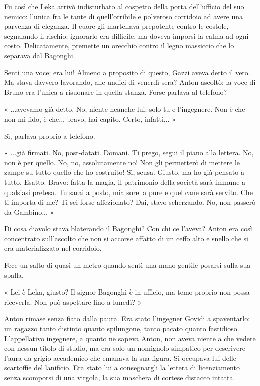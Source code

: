 Fu così che Leka arrivò indisturbato al cospetto della porta dell'ufficio del suo nemico: l'unica fra le tante di quell'orribile e polveroso corridoio ad avere una parvenza di eleganza. Il cuore gli martellava prepotente contro le costole, segnalando il rischio; ignorarlo era difficile, ma doveva imporsi la calma ad ogni costo. Delicatamente, premette un orecchio contro il legno massiccio che lo separava dal Bagonghi.

Sentì una voce: era lui! Almeno a proposito di questo, Gazzi aveva detto il vero. Ma stava davvero lavorando, alle undici di venerdì sera? Anton ascoltò: la voce di Bruno era l'unica a risuonare in quella stanza. Forse parlava al telefono?

« ...avevamo già detto. No, niente neanche lui: solo tu e l'ingegnere. Non è che non mi fido, è che... bravo, hai capito. Certo, infatti... »

Sì, parlava proprio a telefono.

« ...già firmati. No, post-datati. Domani. Ti prego, segui il piano alla lettera. No, non è per quello. No, no, assolutamente no! Non gli permetterò di mettere le zampe su tutto quello che ho costruito! Sì, scusa. Giusto, ma ho già pensato a tutto. Esatto. Bravo: fatta la magia, il patrimonio della società sarà immune a qualsiasi pretesa. Tu sarai a posto, mia sorella pure e quel cane sarà servito. Che ti importa di me? Ti sei forse affezionato? Dai, stavo scherzando. No, non passerò da Gambino... »

Di cosa diavolo stava blaterando il Bagonghi? Con chi ce l'aveva? Anton era così concentrato sull'ascolto che non si accorse affatto di un ceffo alto e snello che si era materializzato nel corridoio.

Fece un salto di quasi un metro quando sentì una mano gentile posarsi sulla sua spalla.

« Lei è Leka, giusto? Il signor Bagonghi è in ufficio, ma temo proprio non possa riceverla. Non può aspettare fino a lunedì? »

Anton rimase senza fiato dalla paura. Era stato l'ingegner Govidi a spaventarlo: un ragazzo tanto distinto quanto spilungone, tanto pacato quanto fastidioso. L'appellativo ingegnere, a quanto ne sapeva Anton, non aveva niente a che vedere con nessun titolo di studio, ma era solo un nomignolo simpatico per descrivere l'aura da grigio accademico che emanava la sua figura. Si occupava lui delle scartoffie del lanificio. Era stato lui a consegnargli la lettera di licenziamento senza scomporsi di una virgola, la sua maschera di cortese distacco intatta.


